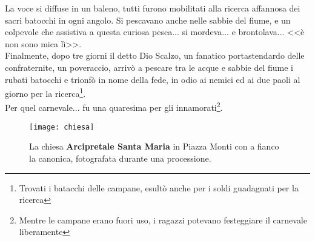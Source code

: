 \indent La voce si diffuse in un baleno, tutti furono mobilitati alla ricerca affannosa dei sacri batocchi in ogni angolo. Si pescavano anche nelle sabbie del fiume, e un colpevole che assistiva a questa curiosa pesca... si mordeva... e brontolava... <<è non sono mica lì>>.\\
\indent Finalmente, dopo tre giorni il detto Dio Scalzo, un fanatico portastendardo delle confraternite, un poveraccio, arrivò a pescare tra le acque e sabbie del fiume i rubati batocchi e trionfò in nome della fede, in odio ai nemici ed ai due paoli al giorno per la ricerca\footnote{Trovati i batacchi delle campane, esultò anche per i soldi guadagnati per la ricerca}.\\
\indent Per quel carnevale... fu una quaresima per gli innamorati\footnote{Mentre le campane erano fuori uso, i ragazzi potevano festeggiare il carnevale liberamente}.
 
 
 
 \begin{figure}[htb]
    \centering
    \vspace{-0.2cm}
    \texttt{[image: chiesa]}
    \caption[Arcipretale Santa Maria]{La chiesa \textbf{Arcipretale Santa Maria} in Piazza Monti con a fianco la canonica, fotografata durante una processione.\label{fig:chiesa}}
    \vspace{-0.7cm}
\end{figure}






















%